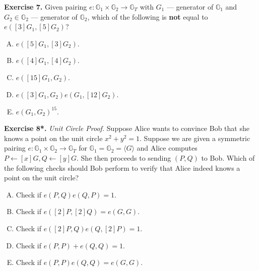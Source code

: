 \documentclass[../lecture-notes.tex]{subfiles}
\begin{document}
\textbf{Exercise 7.} Given pairing $e: \mathbb{G}_1 \times \mathbb{G}_2 \to \mathbb{G}_T$ with $G_1$ --- generator of $\mathbb{G}_1$ and $G_2 \in \mathbb{G}_2$ --- generator of $\mathbb{G}_2$, which of the following is \textbf{not} equal to $e([3]G_1, [5]G_2)$?
\begin{multicols}{2}
    \begin{enumerate}[(A)]
        \item $e([5]G_1, [3]G_2)$.
        \item $e([4]G_1, [4]G_2)$.
        \item $e([15]G_1, G_2)$.
        \item $e([3]G_1,G_2)e(G_1,[12]G_2)$.
        \item $e(G_1, G_2)^{15}$.
    \end{enumerate} 
\end{multicols}

\textbf{Exercise 8*.} \textit{Unit Circle Proof.} Suppose Alice wants to convince Bob that she knows a point on the unit circle $x^2+y^2=1$. Suppose we are given a symmetric pairing $e: \mathbb{G}_1 \times \mathbb{G}_2 \to \mathbb{G}_T$ for $\mathbb{G}_1=\mathbb{G}_2=\langle G \rangle$ and Alice computes $P \gets [x]G, Q \gets [y]G$. She then proceeds to sending $(P,Q)$ to Bob. Which of the following checks should Bob perform to verify that Alice indeed knows a point on the unit circle?
\begin{enumerate}[(A)]
    \item Check if $e(P,Q)e(Q,P)=1$.
    \item Check if $e([2]P,[2]Q) = e(G,G)$.
    \item Check if $e([2]P,Q)e(Q,[2]P) = 1$.
    \item Check if $e(P,P)+e(Q,Q) = 1$.
    \item Check if $e(P,P)e(Q,Q)=e(G,G)$.
\end{enumerate}
\end{document}
